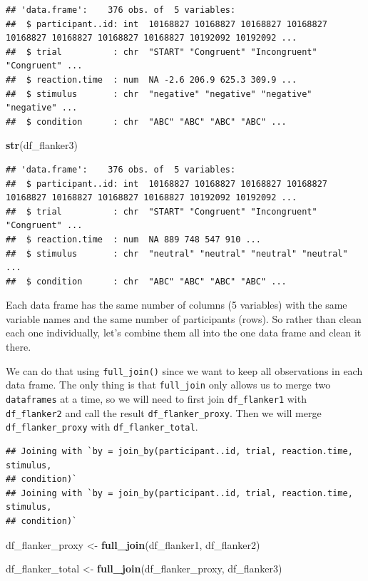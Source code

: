 \documentclass[
]{book}
\newenvironment{Shaded}{\begin{snugshade}}{\end{snugshade}}
\newcommand{\FunctionTok}[1]{\textcolor[rgb]{0.13,0.29,0.53}{\textbf{#1}}}
\newcommand{\NormalTok}[1]{#1}
\newcommand{\OtherTok}[1]{\textcolor[rgb]{0.56,0.35,0.01}{#1}}
\begin{document}
\begin{verbatim}
## 'data.frame':    376 obs. of  5 variables:
##  $ participant..id: int  10168827 10168827 10168827 10168827 10168827 10168827 10168827 10168827 10192092 10192092 ...
##  $ trial          : chr  "START" "Congruent" "Incongruent" "Congruent" ...
##  $ reaction.time  : num  NA -2.6 206.9 625.3 309.9 ...
##  $ stimulus       : chr  "negative" "negative" "negative" "negative" ...
##  $ condition      : chr  "ABC" "ABC" "ABC" "ABC" ...
\end{verbatim}

\begin{Shaded}
\begin{Highlighting}[]
\FunctionTok{str}\NormalTok{(df\_flanker3)}
\end{Highlighting}
\end{Shaded}

\begin{verbatim}
## 'data.frame':    376 obs. of  5 variables:
##  $ participant..id: int  10168827 10168827 10168827 10168827 10168827 10168827 10168827 10168827 10192092 10192092 ...
##  $ trial          : chr  "START" "Congruent" "Incongruent" "Congruent" ...
##  $ reaction.time  : num  NA 889 748 547 910 ...
##  $ stimulus       : chr  "neutral" "neutral" "neutral" "neutral" ...
##  $ condition      : chr  "ABC" "ABC" "ABC" "ABC" ...
\end{verbatim}

Each data frame has the same number of columns (5 variables) with the same variable names and the same number of participants (rows). So rather than clean each one individually, let's combine them all into the one data frame and clean it there.

We can do that using \texttt{full\_join()} since we want to keep all observations in each data frame. The only thing is that \texttt{full\_join} only allows us to merge two \texttt{dataframes} at a time, so we will need to first join \texttt{df\_flanker1} with \texttt{df\_flanker2} and call the result \texttt{df\_flanker\_proxy}. Then we will merge \texttt{df\_flanker\_proxy} with \texttt{df\_flanker\_total}.

\begin{verbatim}
## Joining with `by = join_by(participant..id, trial, reaction.time, stimulus,
## condition)`
## Joining with `by = join_by(participant..id, trial, reaction.time, stimulus,
## condition)`
\end{verbatim}

\begin{Shaded}
\begin{Highlighting}[]
\NormalTok{df\_flanker\_proxy }\OtherTok{\textless{}{-}} \FunctionTok{full\_join}\NormalTok{(df\_flanker1, df\_flanker2)}

\NormalTok{df\_flanker\_total }\OtherTok{\textless{}{-}} \FunctionTok{full\_join}\NormalTok{(df\_flanker\_proxy, df\_flanker3)}
\end{Highlighting}
\end{Shaded}
\end{document}
